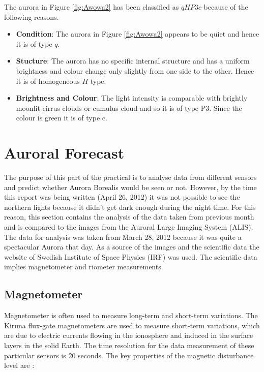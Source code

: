 \documentclass{article}
\begin{document}
The aurora in Figure \ref{fig:Awowa2} has been classified as $qHP3c$ because of the following reasons.

\begin{itemize}
\item \textbf{Condition}:  The aurora in Figure \ref{fig:Awowa2} appears to be quiet and hence it is of type $q$.
\item \textbf{Stucture}: The aurora has no specific internal structure and has a uniform brightness and colour change only slightly from one side to the other. Hence it is of homogeneous $H$ type.
\item \textbf{Brightness and Colour}: The light intensity is comparable with brightly moonlit cirrus clouds or cumulus cloud and so it is of type P3. Since the colour is green it is of type c.
\end{itemize}


\section{Auroral Forecast}

The purpose of this part of the practical is to analyse data from different sensors and predict whether Aurora Borealis would be seen or not. However, by the time this report was being written (April 26, 2012) it was not possible to see the northern lights because it didn't get dark enough during the night time. For this reason, this section contains the analysis of the data taken from previous month and is compared to the images from the Auroral Large Imaging System (ALIS).
\\
The data for analysis was taken from March 28, 2012 because it was quite a spectacular Aurora that day. As a source of the images and the scientific data the website of Swedish Institute of Space Physics (IRF) was used. The scientific data implies magnetometer and riometer measurements.

\subsection{Magnetometer}
Magnetometer is often used to measure long-term and short-term variations. The Kiruna flux-gate magnetometers are used to measure short-term variations, which are due to electric currents flowing in the ionosphere and induced in the surface layers in the solid Earth. The time resolution for the data measurement of these particular sensors is 20 seconds. The key properties of the magnetic disturbance level are \cite{KivelsonRussell:1996isp}:
\end{document}
